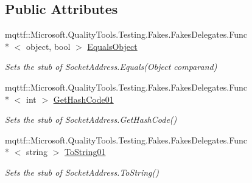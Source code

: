 \subsection*{Public Attributes}
\begin{DoxyCompactItemize}
\item 
mqttf\-::\-Microsoft.\-Quality\-Tools.\-Testing.\-Fakes.\-Fakes\-Delegates.\-Func\\*
$<$ object, bool $>$ \hyperlink{class_system_1_1_net_1_1_fakes_1_1_stub_socket_address_a49943c951dae6087c2e05b82db8c8cc4}{Equals\-Object}
\begin{DoxyCompactList}\small\item\em Sets the stub of Socket\-Address.\-Equals(\-Object comparand)\end{DoxyCompactList}\item 
mqttf\-::\-Microsoft.\-Quality\-Tools.\-Testing.\-Fakes.\-Fakes\-Delegates.\-Func\\*
$<$ int $>$ \hyperlink{class_system_1_1_net_1_1_fakes_1_1_stub_socket_address_ab7241a4acf5bdf3ab4cc378dfa26aa59}{Get\-Hash\-Code01}
\begin{DoxyCompactList}\small\item\em Sets the stub of Socket\-Address.\-Get\-Hash\-Code()\end{DoxyCompactList}\item 
mqttf\-::\-Microsoft.\-Quality\-Tools.\-Testing.\-Fakes.\-Fakes\-Delegates.\-Func\\*
$<$ string $>$ \hyperlink{class_system_1_1_net_1_1_fakes_1_1_stub_socket_address_a88b8e2b86bd82a9355020508de3c0c5c}{To\-String01}
\begin{DoxyCompactList}\small\item\em Sets the stub of Socket\-Address.\-To\-String()\end{DoxyCompactList}\end{DoxyCompactItemize}
